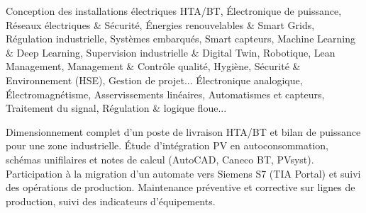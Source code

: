 \documentclass[10pt,a4paper]{../altacv}
\begin{document}
\cvidentite
{}
\makecvheader

\cvformation
{Conception des installations électriques HTA/BT, Électronique de puissance, Réseaux électriques \& Sécurité, Énergies renouvelables \& Smart Grids, Régulation industrielle, Systèmes embarqués, Smart capteurs, Machine Learning \& Deep Learning, Supervision industrielle \& Digital Twin, Robotique, Lean Management, Management \& Contrôle qualité, Hygiène, Sécurité \& Environnement (HSE), Gestion de projet...}
{Électronique analogique, Électromagnétisme, Asservissements linéaires, Automatismes et capteurs, Traitement du signal, Régulation \& logique floue...}

\expcore
{Dimensionnement complet d’un poste de livraison HTA/BT et bilan de puissance pour une zone industrielle.}
{Étude d’intégration PV en autoconsommation, schémas unifilaires et notes de calcul (AutoCAD, Caneco BT, PVsyst).}
\vspace{2pt}
\expmenara
{Participation à la migration d’un automate vers Siemens S7 (TIA Portal) et suivi des opérations de production.}
{Maintenance préventive et corrective sur lignes de production, suivi des indicateurs d’équipements.}
\end{document}
